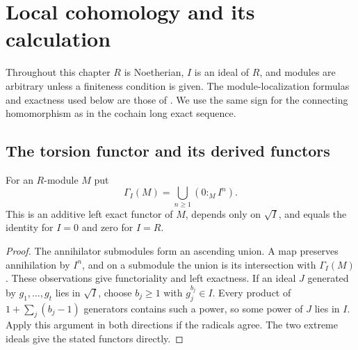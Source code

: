 \chapter{Local cohomology and its calculation}
\label{ch:local-cohomology}

Throughout this chapter \(R\) is Noetherian, \(I\) is an ideal of \(R\),
and modules are arbitrary unless a finiteness condition is given.
The module-localization formulas and exactness used below are those of
\cite[ALG-05-C01-S01]{p103}. We use the same sign for the connecting
homomorphism as in the cochain long exact sequence.

\section{The torsion functor and its derived functors}

\begin{definition}\label{res:L01}
For an \(R\)-module \(M\) put
\[
 \Gamma_I(M)=\bigcup_{n\geq 1}(0:_M I^n).
\]
This is an additive left exact functor of \(M\), depends only on \(\sqrt I\),
and equals the identity for \(I=0\) and zero for \(I=R\).
\end{definition}
\begin{proof}
The annihilator submodules form an ascending union. A map preserves
annihilation by \(I^n\), and on a submodule the union is its intersection
with \(\Gamma_I(M)\). These observations give functoriality and left
exactness. If an ideal \(J\) generated by \(g_1,\ldots,g_t\) lies in
\(\sqrt I\), choose \(b_j\geq1\) with \(g_j^{b_j}\in I\). Every product
of \(1+\sum_j(b_j-1)\) generators contains such a power, so some power
of \(J\) lies in \(I\). Apply this argument in both directions if the
radicals agree. The two extreme ideals give the stated functors directly.
\end{proof}


